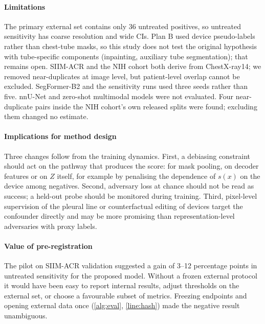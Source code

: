 \documentclass[final,3p]{elsarticle}
\begin{document}
\paragraph{Limitations}
The primary external set contains only 36 untreated positives, so untreated sensitivity has coarse resolution and wide CIs. Plan B used device pseudo-labels rather than chest-tube masks, so this study does not test the original hypothesis with tube-specific components (inpainting, auxiliary tube segmentation); that remains open. SIIM-ACR and the NIH cohort both derive from ChestX-ray14; we removed near-duplicates at image level, but patient-level overlap cannot be excluded. SegFormer-B2 and the sensitivity runs used three seeds rather than five. nnU-Net and zero-shot multimodal models were not evaluated. Four near-duplicate pairs inside the NIH cohort's own released splits were found; excluding them changed no estimate.

\paragraph{Implications for method design}
Three changes follow from the training dynamics. First, a debiasing constraint should act on the pathway that produces the score: for mask pooling, on decoder features or on $Z$ itself, for example by penalising the dependence of $s(x)$ on the device among negatives. Second, adversary loss at chance should not be read as success; a held-out probe should be monitored during training. Third, pixel-level supervision of the pleural line \citep{rueckel2021annotations} or counterfactual editing of devices \citep{cooke2026roentmod} target the confounder directly and may be more promising than representation-level adversaries with proxy labels.

\paragraph{Value of pre-registration}
The pilot on SIIM-ACR validation suggested a gain of 3--12 percentage points in untreated sensitivity for the proposed model. Without a frozen external protocol it would have been easy to report internal results, adjust thresholds on the external set, or choose a favourable subset of metrics. Freezing endpoints and opening external data once (\cref{alg:eval}, \cref{line:hash}) made the negative result unambiguous.

\end{document}
